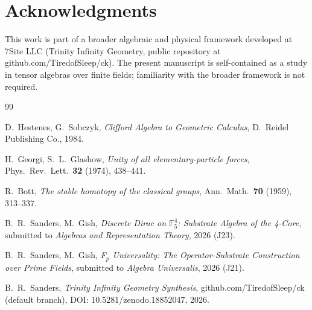 \documentclass[11pt,reqno]{amsart}
\theoremstyle{plain}
\theoremstyle{definition}
\theoremstyle{remark}
\newcommand{\F}{\mathbb{F}}
\begin{document}
\section*{Acknowledgments}

This work is part of a broader algebraic and physical framework
developed at 7Site LLC (Trinity Infinity Geometry, public repository
at github.com/TiredofSleep/ck). The present manuscript is
self-contained as a study in tensor algebras over finite fields;
familiarity with the broader framework is not required.

\begin{thebibliography}{99}

 D.~Hestenes, G.~Sobczyk,
\emph{Clifford Algebra to Geometric Calculus},
D.~Reidel Publishing Co., 1984.

 H.~Georgi, S.~L.~Glashow,
\emph{Unity of all elementary-particle forces},
Phys.~Rev.~Lett.~\textbf{32} (1974), 438--441.

 R.~Bott,
\emph{The stable homotopy of the classical groups},
Ann.~Math.~\textbf{70} (1959), 313--337.

 B.~R.~Sanders, M.~Gish,
\emph{Discrete Dirac on $\F_5^4$: Substrate Algebra of the 4-Core},
submitted to \emph{Algebras and Representation Theory}, 2026 (J23).

 B.~R.~Sanders, M.~Gish,
\emph{F$_p$ Universality: The Operator-Substrate Construction over
Prime Fields}, submitted to \emph{Algebra Universalis}, 2026 (J21).

 B.~R.~Sanders,
\emph{Trinity Infinity Geometry Synthesis},
github.com/TiredofSleep/ck (default branch),
DOI: 10.5281/zenodo.18852047, 2026.

\end{thebibliography}
\end{document}
